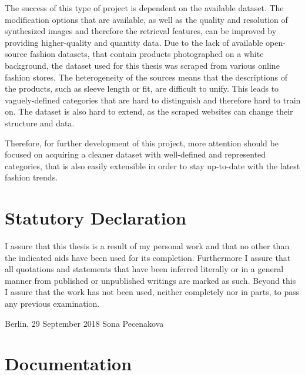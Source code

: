 \documentclass[12pt]{report}
\begin{document}
The success of this type of project is dependent on the available dataset. The modification options that are available, as well as the quality and resolution of synthesized images and therefore the retrieval features, can be improved by providing higher-quality and quantity data. Due to the lack of available open-source fashion datasets, that contain products photographed on a white background, the dataset used for this thesis was scraped from various online fashion stores. The heterogeneity of the sources means that the descriptions of the products, such as sleeve length or fit, are difficult to unify. This leads to vaguely-defined categories that are hard to distinguish and therefore hard to train on. The dataset is also hard to extend, as the scraped websites can change their structure and data.

Therefore, for further development of this project, more attention should be focused on acquiring a cleaner dataset with well-defined and represented categories, that is also easily extensible in order to stay up-to-date with the latest fashion trends.

\appendix

\newpage
{}

\renewcommand{\refname}{Bibliography}

\clearpage

\pagestyle{plain}
\chapter*{Statutory Declaration}
I assure that this thesis is a result of my personal work and that no other than the indicated aids have been used for its completion. Furthermore I assure that all quotations and statements that have been inferred literally or in a general manner from published or unpublished writings are marked as such. Beyond this I assure that the work has not been used, neither completely nor in parts, to pass any previous examination.

\vspace{2cm}
\noindent
Berlin, 29 September 2018
\hfill
Sona Pecenakova
\clearpage

\chapter{Documentation} \label{app:doc}
\end{document}

